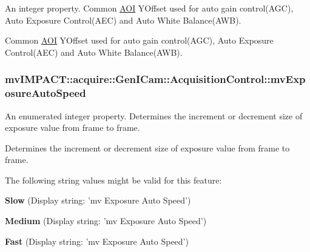 An integer property. Common \hyperlink{struct_a_o_i}{A\+O\+I} Y\+Offset used for auto gain control(\+A\+G\+C), Auto Exposure Control(\+A\+E\+C) and Auto White Balance(\+A\+W\+B). 

Common \hyperlink{struct_a_o_i}{A\+O\+I} Y\+Offset used for auto gain control(\+A\+G\+C), Auto Exposure Control(\+A\+E\+C) and Auto White Balance(\+A\+W\+B). \hypertarget{classmv_i_m_p_a_c_t_1_1acquire_1_1_gen_i_cam_1_1_acquisition_control_a20d51c921f1bb1f1f13d012fd80a1968}{
\subsubsection[{mv\+Exposure\+Auto\+Speed}]{ mv\+I\+M\+P\+A\+C\+T\+::acquire\+::\+Gen\+I\+Cam\+::\+Acquisition\+Control\+::mv\+Exposure\+Auto\+Speed}}\label{classmv_i_m_p_a_c_t_1_1acquire_1_1_gen_i_cam_1_1_acquisition_control_a20d51c921f1bb1f1f13d012fd80a1968}


An enumerated integer property. Determines the increment or decrement size of exposure value from frame to frame. 

Determines the increment or decrement size of exposure value from frame to frame.

The following string values might be valid for this feature\+:
\begin{DoxyItemize}
\item {\bfseries Slow} (Display string\+: 'mv Exposure Auto Speed')
\item {\bfseries Medium} (Display string\+: 'mv Exposure Auto Speed')
\item {\bfseries Fast} (Display string\+: 'mv Exposure Auto Speed')
\end{DoxyItemize}

